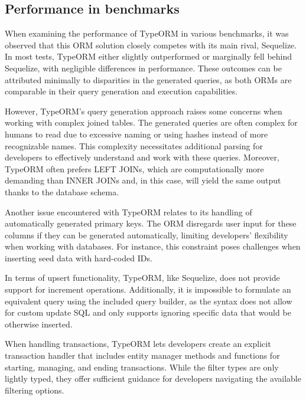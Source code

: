 \subsection{Performance in benchmarks}

When examining the performance of TypeORM in various benchmarks, it was observed
that this ORM solution closely competes with its main rival, Sequelize. In most
tests, TypeORM either slightly outperformed or marginally fell behind Sequelize,
with negligible differences in performance. These outcomes can be attributed
minimally to disparities in the generated queries, as both ORMs are comparable
in their query generation and execution capabilities.

However, TypeORM's query generation approach raises some concerns when working
with complex joined tables. The generated queries are often complex for humans
to read due to excessive naming or using hashes instead of more recognizable
names. This complexity necessitates additional parsing for developers to
effectively understand and work with these queries. Moreover, TypeORM often
prefers LEFT JOINs, which are computationally more demanding than INNER JOINs
and, in this case, will yield the same output thanks to the database schema.

Another issue encountered with TypeORM relates to its handling of automatically
generated primary keys. The ORM disregards user input for these columns if they
can be generated automatically, limiting developers' flexibility when working
with databases. For instance, this constraint poses challenges when inserting
seed data with hard-coded IDs.

In terms of upsert functionality, TypeORM, like Sequelize, does not provide
support for increment operations. Additionally, it is impossible to formulate an
equivalent query using the included query builder, as the syntax does not allow
for custom update SQL and only supports ignoring specific data that would be
otherwise inserted.

When handling transactions, TypeORM lets developers create an explicit
transaction handler that includes entity manager methods and functions for
starting, managing, and ending transactions. While the filter types are only
lightly typed, they offer sufficient guidance for developers navigating the
available filtering options.

